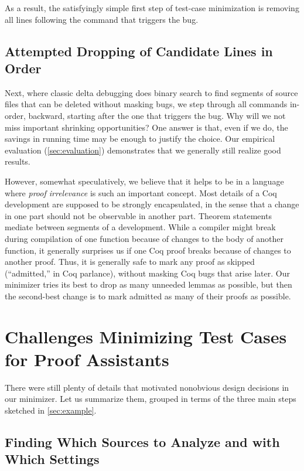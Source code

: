 \documentclass[a4paper,USenglish,cleveref,autoref,thm-restate]{lipics-v2021}
\begin{document}
As a result, the satisfyingly simple first step of test-case minimization is removing all lines following the command that triggers the bug.

\subsection{Attempted Dropping of Candidate Lines in Order}

Next, where classic delta debugging does binary search to find segments of source files that can be deleted without masking bugs, we step through all commands in-order, backward, starting after the one that triggers the bug.
Why will we not miss important shrinking opportunities?
One answer is that, even if we do, the savings in running time may be enough to justify the choice.
Our empirical evaluation (\autoref{sec:evaluation}) demonstrates that we generally still realize good results.

However, somewhat speculatively, we believe that it helps to be in a language where \emph{proof irrelevance} is such an important concept.
Most details of a Coq development are supposed to be strongly encapsulated, in the sense that a change in one part should not be observable in another part.
Theorem statements mediate between segments of a development.
While a compiler might break during compilation of one function because of changes to the body of another function, it generally surprises us if one Coq proof breaks because of changes to another proof.
Thus, it is generally safe to mark any proof as skipped (``admitted,'' in Coq parlance), without masking Coq bugs that arise later.
Our minimizer tries its best to drop as many unneeded lemmas as possible, but then the second-best change is to mark admitted as many of their proofs as possible.


\section{Challenges Minimizing Test Cases for Proof Assistants}

There were still plenty of details that motivated nonobvious design decisions in our minimizer.
Let us summarize them, grouped in terms of the three main steps sketched in \autoref{sec:example}.

\subsection{Finding Which Sources to Analyze and with Which Settings}
\end{document}
